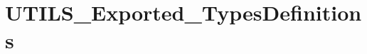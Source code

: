 \hypertarget{group___u_t_i_l_s___exported___types_definitions}{}\section{U\+T\+I\+L\+S\+\_\+\+Exported\+\_\+\+Types\+Definitions}
\label{group___u_t_i_l_s___exported___types_definitions}
